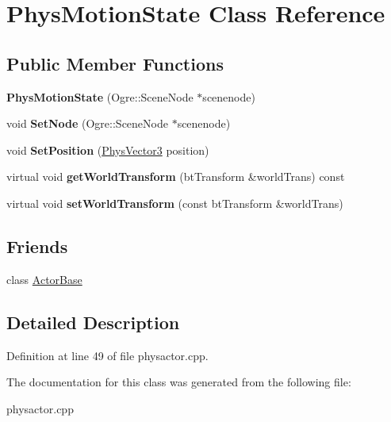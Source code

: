 \hypertarget{classPhysMotionState}{
\section{PhysMotionState Class Reference}
\label{d2/d14/classPhysMotionState}
}
\subsection*{Public Member Functions}
\begin{DoxyCompactItemize}
\item 
\hypertarget{classPhysMotionState_a9c315b85bc405a36a6bd9d9a9f68c34a}{
{\bfseries PhysMotionState} (Ogre::SceneNode $\ast$scenenode)}
\label{d2/d14/classPhysMotionState_a9c315b85bc405a36a6bd9d9a9f68c34a}

\item 
\hypertarget{classPhysMotionState_a4ba21f0b58f33197b61cf1a9754027bc}{
void {\bfseries SetNode} (Ogre::SceneNode $\ast$scenenode)}
\label{d2/d14/classPhysMotionState_a4ba21f0b58f33197b61cf1a9754027bc}

\item 
\hypertarget{classPhysMotionState_aa2fa4f107147626cd33d42fd3fbe178b}{
void {\bfseries SetPosition} (\hyperlink{classPhysVector3}{PhysVector3} position)}
\label{d2/d14/classPhysMotionState_aa2fa4f107147626cd33d42fd3fbe178b}

\item 
\hypertarget{classPhysMotionState_ad7f6fc932da90cc2a718fbe809d95287}{
virtual void {\bfseries getWorldTransform} (btTransform \&worldTrans) const }
\label{d2/d14/classPhysMotionState_ad7f6fc932da90cc2a718fbe809d95287}

\item 
\hypertarget{classPhysMotionState_a57c23b922e2c5e8af87dc1318796ec8b}{
virtual void {\bfseries setWorldTransform} (const btTransform \&worldTrans)}
\label{d2/d14/classPhysMotionState_a57c23b922e2c5e8af87dc1318796ec8b}

\end{DoxyCompactItemize}
\subsection*{Friends}
\begin{DoxyCompactItemize}
\item 
\hypertarget{classPhysMotionState_ac09063d4b0192680ba3aa0bd4003a274}{
class \hyperlink{classPhysMotionState_ac09063d4b0192680ba3aa0bd4003a274}{ActorBase}}
\label{d2/d14/classPhysMotionState_ac09063d4b0192680ba3aa0bd4003a274}

\end{DoxyCompactItemize}


\subsection{Detailed Description}


Definition at line 49 of file physactor.cpp.

The documentation for this class was generated from the following file:\begin{DoxyCompactItemize}
\item 
physactor.cpp\end{DoxyCompactItemize}
